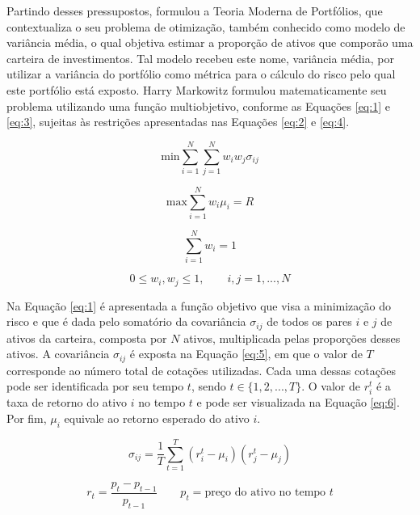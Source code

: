 \documentclass[11pt]{article}
\begin{document}
Partindo desses pressupostos,  formulou a Teoria Moderna de Portfólios, que contextualiza o seu problema de otimização, também conhecido como modelo de variância média, o qual objetiva estimar a proporção de ativos que comporão uma carteira de investimentos. Tal modelo recebeu este nome, variância média, por utilizar a variância do portfólio como métrica para o cálculo do risco pelo qual este portfólio está exposto. Harry Markowitz formulou matematicamente seu problema utilizando uma função multiobjetivo, conforme as Equações \ref{eq:1} e \ref{eq:3}, sujeitas às restrições apresentadas nas Equações \ref{eq:2} e \ref{eq:4}.

\begin{equation} \label{eq:1}
\text{min}\sum_{i=1}^{N} \sum_{j=1}^{N} w_{i}w_{j}\sigma_{ij} 
\end{equation}

\begin{equation} \label{eq:3}
    \text{max}\sum_{i=1}^{N} w_{i}\mu_{i} = R
\end{equation}

\begin{equation} \label{eq:2}
\sum_{i=1}^{N} w_{i} = 1
\end{equation}

\begin{equation} \label{eq:4}
    0 \leq w_{i}, w_{j} \leq 1, \qquad i,j = 1, ..., N
\end{equation}

    Na Equação \ref{eq:1} é apresentada a função objetivo que visa a minimização do risco e que é dada pelo somatório da covariância $\sigma_{ij}$ de todos os pares $i$ e $j$ de ativos da carteira, composta por $N$ ativos, multiplicada pelas proporções desses ativos. A covariância $\sigma_{ij}$ é exposta na Equação \ref{eq:5}, em que o valor de $T$ corresponde ao número total de cotações utilizadas. Cada uma dessas cotações pode ser identificada por seu tempo $t$, sendo $t \in \{1, 2, ..., T\}$. O valor de $r_{i}^{t}$ é a taxa de retorno do ativo $i$ no tempo $t$ e pode ser visualizada na Equação \ref{eq:6}. Por fim, $\mu_{i}$ equivale ao retorno esperado do ativo $i$. 

    \begin{equation} \label{eq:5}
        \sigma_{ij} = \frac{1}{T} \sum_{t=1}^{T} (r_{i}^{t} - \mu_{i}) (r_{j}^{t} - \mu_{j})
    \end{equation}
    
    \begin{equation} \label{eq:6}
        r_{t} = \frac{p_{t} - p_{t-1}}{p_{t-1}} \qquad p_{t} = \text{preço do ativo no tempo $t$}
    \end{equation}
\end{document}

